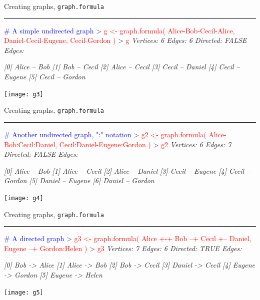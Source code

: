 \documentclass[landscape]{foils}
\newcommand{\stitle}[1]{{\centering\color{blue}\Large #1\par\vspace*{10pt}\hrule}}
\newcommand{\command}[1]{\textcolor{red}{#1}}
\newcommand{\comment}[1]{\textcolor{blue}{#1}}
\begin{document}
\newpage
\stitle{Creating graphs, \texttt{graph.formula}}
\begin{Myverb}
\comment{# A simple undirected graph}
> \command{g <- graph.formula( Alice-Bob-Cecil-Alice, }
\command{       Daniel-Cecil-Eugene, Cecil-Gordon )}
> \command{g}
\slshape Vertices: 6 
\slshape Edges: 6 
\slshape Directed: FALSE 
\slshape Edges:
                    
\slshape [0] Alice  -- Bob   
\slshape [1] Bob    -- Cecil 
\slshape [2] Alice  -- Cecil 
\slshape [3] Cecil  -- Daniel
\slshape [4] Cecil  -- Eugene
\slshape [5] Cecil  -- Gordon
\end{Myverb}
\begin{flushright}
\vspace*{-9.5cm}
\texttt{[image: g3]}
\end{flushright}

\newpage
\stitle{Creating graphs, \texttt{graph.formula}}
\begin{Myverb}
\comment{# Another undirected graph, ":" notation}
> \command{g2 <- graph.formula( Alice-Bob:Cecil:Daniel, }
\command{        Cecil:Daniel-Eugene:Gordon )}
> \command{g2}
\slshape Vertices: 6 
\slshape Edges: 7 
\slshape Directed: FALSE 
\slshape Edges:
                    
\slshape [0] Alice  -- Bob   
\slshape [1] Alice  -- Cecil 
\slshape [2] Alice  -- Daniel
\slshape [3] Cecil  -- Eugene
\slshape [4] Cecil  -- Gordon
\slshape [5] Daniel -- Eugene
\slshape [6] Daniel -- Gordon
\end{Myverb}
\begin{flushright}
\vspace*{-10.5cm}
\texttt{[image: g4]}
\end{flushright}

\newpage
\stitle{Creating graphs, \texttt{graph.formula}}
\begin{Myverb}
\comment{# A directed graph}
> \command{g3 <- graph.formula( Alice +-+ Bob --+ Cecil }
\command{        +-- Daniel, Eugene --+ Gordon:Helen )}
> \command{g3}
\slshape Vertices: 7 
\slshape Edges: 6 
\slshape Directed: TRUE 
\slshape Edges:
                    
\slshape [0] Bob    -> Alice 
\slshape [1] Alice  -> Bob   
\slshape [2] Bob    -> Cecil 
\slshape [3] Daniel -> Cecil 
\slshape [4] Eugene -> Gordon
\slshape [5] Eugene -> Helen 
\end{Myverb}
\begin{flushright}
\vspace*{-9.5cm}
\texttt{[image: g5]}
\end{flushright}
\end{document}
